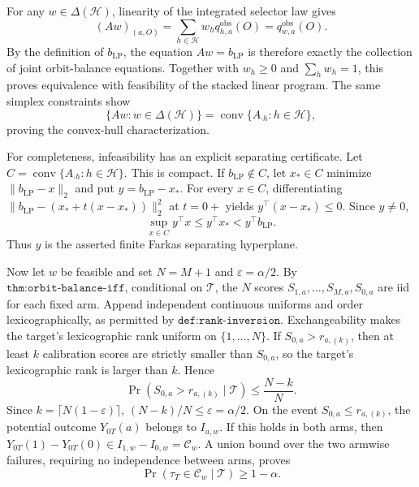 For any \(w\in\Delta(\mathcal H)\), linearity of the integrated selector law gives \[(Aw)_{(a,O)}=\sum_{h\in\mathcal H}w_hq^{\mathrm{obs}}_{h,a}(O)=q^{\mathrm{obs}}_{w,a}(O).\] By the definition of \(b_{\mathrm{LP}}\), the equation \(Aw=b_{\mathrm{LP}}\) is therefore exactly the collection of joint orbit-balance equations. Together with \(w_h\ge0\) and \(\sum_hw_h=1\), this proves equivalence with feasibility of the stacked linear program. The same simplex constraints show \[\{Aw:w\in\Delta(\mathcal H)\}=\operatorname{conv}\{A_{\cdot h}:h\in\mathcal H\},\] proving the convex-hull characterization.

For completeness, infeasibility has an explicit separating certificate. Let \(C=\operatorname{conv}\{A_{\cdot h}:h\in\mathcal H\}\). This is compact. If \(b_{\mathrm{LP}}\notin C\), let \(x_*\in C\) minimize \(\|b_{\mathrm{LP}}-x\|_2\) and put \(y=b_{\mathrm{LP}}-x_*\). For every \(x\in C\), differentiating \(\|b_{\mathrm{LP}}-(x_*+t(x-x_*))\|_2^2\) at \(t=0+\) yields \(y^\top(x-x_*)\le0\). Since \(y\ne0\), \[\sup_{x\in C}y^\top x\le y^\top x_*<y^\top b_{\mathrm{LP}}.\] Thus \(y\) is the asserted finite Farkas separating hyperplane.

Now let \(w\) be feasible and set \(N=M+1\) and \(\varepsilon=\alpha/2\). By \(\texttt{thm:orbit-balance-iff}\), conditional on \(\mathcal T\), the \(N\) scores \(S_{1,a},\ldots,S_{M,a},S_{0,a}\) are iid for each fixed arm. Append independent continuous uniforms and order lexicographically, as permitted by \(\texttt{def:rank-inversion}\). Exchangeability makes the target's lexicographic rank uniform on \(\{1,\ldots,N\}\). If \(S_{0,a}>r_{a,(k)}\), then at least \(k\) calibration scores are strictly smaller than \(S_{0,a}\), so the target's lexicographic rank is larger than \(k\). Hence \[\Pr(S_{0,a}>r_{a,(k)}\mid\mathcal T)\le\frac{N-k}{N}.\] Since \(k=\lceil N(1-\varepsilon)\rceil\), \((N-k)/N\le\varepsilon=\alpha/2\). On the event \(S_{0,a}\le r_{a,(k)}\), the potential outcome \(Y_{0T}(a)\) belongs to \(I_{a,w}\). If this holds in both arms, then \(Y_{0T}(1)-Y_{0T}(0)\in I_{1,w}-I_{0,w}=\mathcal C_w\). A union bound over the two armwise failures, requiring no independence between arms, proves \[\Pr(\tau_T\in\mathcal C_w\mid\mathcal T)\ge1-\alpha.\]